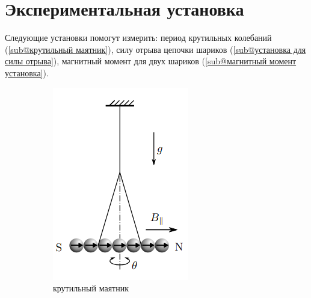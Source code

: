\documentclass[a4paper, 12pt]{article}
\begin{document}
\section*{Экспериментальная установка}
Следующие установки помогут измерить: период крутильных колебаний (\ref{sub@крутильный маятник}), силу отрыва цепочки шариков (\ref{sub@установка для силы отрыва}),
магнитный момент для двух шариков (\ref{sub@магнитный момент установка}).
\begin{figure}[htbp]
        \centering
        \begin{subfigure}{0.2\textwidth}
            \centering
            \includegraphics[width=\linewidth]{p1.png}
            \caption{крутильный маятник}
            \label{крутильный маятник}
        \end{subfigure}
        \hspace{2cm}
        \begin{subfigure}{0.2\textwidth}

\end{subfigure}
\end{figure}
\end{document}
